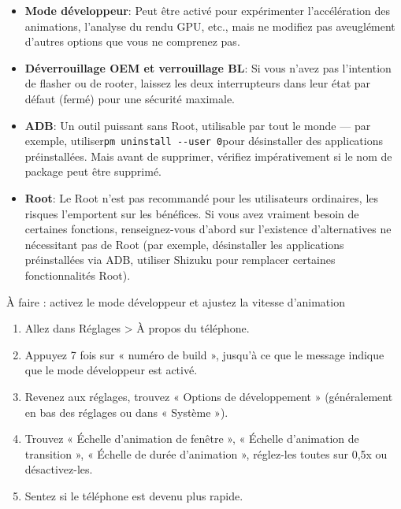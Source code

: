 
\begin{itemize}
  \item \textbf{Mode développeur}: Peut être activé pour expérimenter l'accélération des animations, l'analyse du rendu GPU, etc., mais ne modifiez pas aveuglément d'autres options que vous ne comprenez pas.
  \item \textbf{Déverrouillage OEM et verrouillage BL}: Si vous n'avez pas l'intention de flasher ou de rooter, laissez les deux interrupteurs dans leur état par défaut (fermé) pour une sécurité maximale.
  \item \textbf{ADB}: Un outil puissant sans Root, utilisable par tout le monde — par exemple, utiliser\texttt{pm uninstall -\allowbreak -\allowbreak user 0}pour désinstaller des applications préinstallées. Mais avant de supprimer, vérifiez impérativement si le nom de package peut être supprimé.
  \item \textbf{Root}: Le Root n'est pas recommandé pour les utilisateurs ordinaires, les risques l'emportent sur les bénéfices. Si vous avez vraiment besoin de certaines fonctions, renseignez-vous d'abord sur l'existence d'alternatives ne nécessitant pas de Root (par exemple, désinstaller les applications préinstallées via ADB, utiliser Shizuku pour remplacer certaines fonctionnalités Root).
\end{itemize}

\begin{tcbpractice}{À faire : activez le mode développeur et ajustez la vitesse d'animation}
\begin{enumerate}
  \item Allez dans Réglages > À propos du téléphone.
  \item Appuyez 7 fois sur « numéro de build », jusqu'à ce que le message indique que le mode développeur est activé.
  \item Revenez aux réglages, trouvez « Options de développement » (généralement en bas des réglages ou dans « Système »).
  \item Trouvez « Échelle d'animation de fenêtre », « Échelle d'animation de transition », « Échelle de durée d'animation », réglez-les toutes sur 0,5x ou désactivez-les.
  \item Sentez si le téléphone est devenu plus rapide.
\end{enumerate}

\end{tcbpractice}
